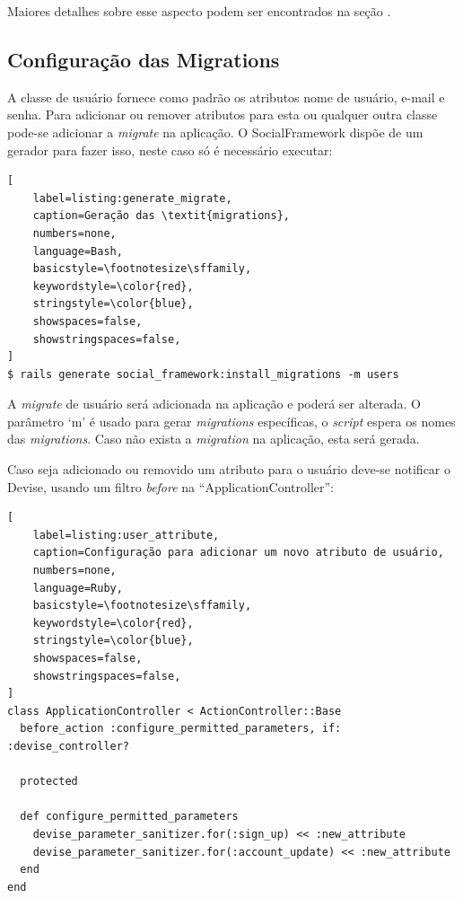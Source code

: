 Maiores detalhes sobre esse aspecto podem ser encontrados na seção .

\subsection{Configuração das Migrations}
\label{configuracao_das_migrations}

A classe de usuário fornece como padrão os atributos nome de usuário, e-mail e senha. Para adicionar ou remover atributos para esta ou qualquer outra classe pode-se adicionar a \textit{migrate} na aplicação. O SocialFramework dispõe de um gerador para fazer isso, neste caso só é necessário executar:

\begin{lstlisting}[
    label=listing:generate_migrate,
    caption=Geração das \textit{migrations},
    numbers=none,
    language=Bash,
    basicstyle=\footnotesize\sffamily,
    keywordstyle=\color{red},
    stringstyle=\color{blue},
    showspaces=false,
    showstringspaces=false,
]
$ rails generate social_framework:install_migrations -m users
\end{lstlisting}

A \textit{migrate} de usuário será adicionada na aplicação e poderá ser alterada. O parâmetro `m' é usado para gerar \textit{migrations} específicas, o \textit{script} espera os nomes das \textit{migrations}. Caso não exista a \textit{migration} na aplicação, esta será gerada.

Caso seja adicionado ou removido um atributo para o usuário deve-se notificar o Devise, usando um filtro \textit{before} na ``ApplicationController'':

\begin{lstlisting}[
    label=listing:user_attribute,
    caption=Configuração para adicionar um novo atributo de usuário,
    numbers=none,
    language=Ruby,
    basicstyle=\footnotesize\sffamily,
    keywordstyle=\color{red},
    stringstyle=\color{blue},
    showspaces=false,
    showstringspaces=false,
]
class ApplicationController < ActionController::Base
  before_action :configure_permitted_parameters, if: :devise_controller?

  protected

  def configure_permitted_parameters
    devise_parameter_sanitizer.for(:sign_up) << :new_attribute
    devise_parameter_sanitizer.for(:account_update) << :new_attribute
  end
end
\end{lstlisting}

